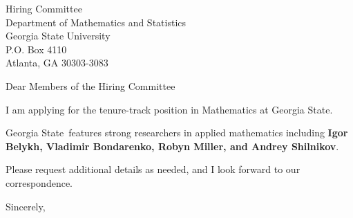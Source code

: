 




	
	
	\def\School{Georgia State}
	
	\begin{letter}
		{Hiring Committee\\
			Department of Mathematics and Statistics\\
			Georgia State University\\
			P.O. Box 4110\\
			Atlanta, GA 30303-3083
		}
		
		\opening{Dear Members of the Hiring Committee}
		
		
		I am applying for the tenure-track position in Mathematics at \School. 
		
		\School~features strong researchers in applied mathematics including \textbf{Igor Belykh, Vladimir Bondarenko, Robyn Miller, and Andrey Shilnikov}. 
		
		
		
		
		
		Please request additional details as needed, and I look forward to our correspondence.
		
		\closing{Sincerely,}
	\end{letter}
